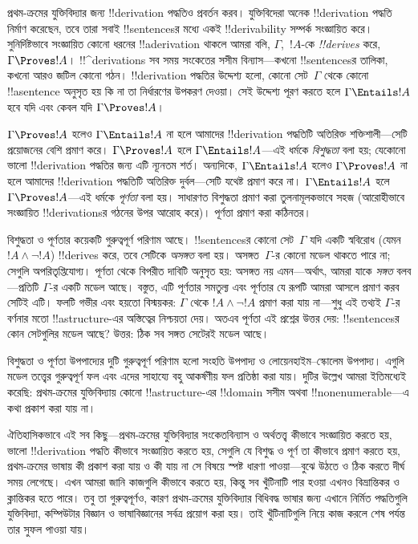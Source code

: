 \documentclass[../../../include/open-logic-section]{subfiles}
\begin{document}


প্রথম-ক্রমের যুক্তিবিদ্যার জন্য !!{derivation} পদ্ধতিও প্রবর্তন করব।
যুক্তিবিদেরা অনেক !!{derivation} পদ্ধতি নির্মাণ করেছেন, তবে তারা সবাই
!!{sentence}sর মধ্যে একই !!{derivability} সম্পর্ক সংজ্ঞায়িত করে।
সুনির্দিষ্টভাবে সংজ্ঞায়িত কোনো ধরনের !!a{derivation} থাকলে আমরা বলি,
$\Gamma$,~$!A$-কে \emph{!!{derive}s} করে, $\Gamma \Proves !A$।
!!^{derivation}s সব সময় সংকেতের সসীম বিন্যাস—কখনো !!{sentence}sর
তালিকা, কখনো আরও জটিল কোনো গঠন। !!{derivation} পদ্ধতির উদ্দেশ্য হলো,
কোনো সেট~$\Gamma$ থেকে কোনো !!a{sentence} অনুসৃত হয় কি না তা নির্ধারণের
উপকরণ দেওয়া। সেই উদ্দেশ্য পূরণ করতে হলে $\Gamma \Entails !A$ হবে যদি
এবং কেবল যদি $\Gamma \Proves !A$।

$\Gamma \Proves !A$ হলেও $\Gamma \Entails !A$ না হলে আমাদের
!!{derivation} পদ্ধতিটি অতিরিক্ত শক্তিশালী—সেটি প্রয়োজনের বেশি প্রমাণ
করে। $\Gamma \Proves !A$ হলে $\Gamma \Entails !A$—এই ধর্মকে
\emph{বিশুদ্ধতা} বলা হয়; যেকোনো ভালো !!{derivation} পদ্ধতির জন্য এটি
ন্যূনতম শর্ত। অন্যদিকে, $\Gamma \Entails !A$ হলেও $\Gamma \Proves !A$
না হলে আমাদের !!{derivation} পদ্ধতিটি অতিরিক্ত দুর্বল—সেটি যথেষ্ট প্রমাণ
করে না। $\Gamma \Entails !A$ হলে $\Gamma \Proves !A$—এই ধর্মকে
\emph{পূর্ণতা} বলা হয়। সাধারণত বিশুদ্ধতা প্রমাণ করা তুলনামূলকভাবে সহজ
(আরোহীভাবে সংজ্ঞায়িত !!{derivation}sর গঠনের উপর আরোহ করে)। পূর্ণতা
প্রমাণ করা কঠিনতর।

বিশুদ্ধতা ও পূর্ণতার কয়েকটি গুরুত্বপূর্ণ পরিণাম আছে। !!{sentence}sর
কোনো সেট~$\Gamma$ যদি একটি স্ববিরোধ (যেমন $!A \land \lnot !A$)
!!{derive}s করে, তবে সেটিকে \emph{অসঙ্গত} বলা হয়। অসঙ্গত~$\Gamma$-র কোনো
মডেল থাকতে পারে না; সেগুলি অপরিতৃপ্তিযোগ্য। পূর্ণতা থেকে বিপরীত দাবিটি
অনুসৃত হয়: অসঙ্গত নয় এমন—অর্থাৎ, আমরা যাকে \emph{সঙ্গত} বলব—প্রতিটি
$\Gamma$-র একটি মডেল আছে। বস্তুত, এটি পূর্ণতার সমতুল্য এবং পূর্ণতার যে
রূপটি আমরা আসলে প্রমাণ করব সেটিই এটি। ফলটি গভীর এবং হয়তো বিস্ময়কর:
$\Gamma$ থেকে $!A \land \lnot !A$ প্রমাণ করা যায় না—শুধু এই তথ্যই
$\Gamma$-র বর্ণনার মতো !!a{structure}-এর অস্তিত্বের নিশ্চয়তা দেয়।
অতএব পূর্ণতা এই প্রশ্নের উত্তর দেয়: !!{sentence}sর কোন সেটগুলির মডেল
আছে? উত্তর: ঠিক সব সঙ্গত সেটেরই মডেল আছে।

বিশুদ্ধতা ও পূর্ণতা উপপাদ্যের দুটি গুরুত্বপূর্ণ পরিণাম হলো সংহতি উপপাদ্য
ও লোয়েনহাইম--স্কোলেম উপপাদ্য। এগুলি মডেল তত্ত্বের গুরুত্বপূর্ণ ফল এবং
এদের সাহায্যে বহু আকর্ষণীয় ফল প্রতিষ্ঠা করা যায়। দুটির উল্লেখ আমরা
ইতিমধ্যেই করেছি: প্রথম-ক্রমের যুক্তিবিদ্যায় কোনো !!a{structure}-এর
!!{domain} সসীম অথবা !!{nonenumerable}—এ কথা প্রকাশ করা যায় না।

ঐতিহাসিকভাবে এই সব কিছু—প্রথম-ক্রমের যুক্তিবিদ্যার সংকেতবিন্যাস ও
অর্থতত্ত্ব কীভাবে সংজ্ঞায়িত করতে হয়, ভালো !!{derivation} পদ্ধতি কীভাবে
সংজ্ঞায়িত করতে হয়, সেগুলি যে বিশুদ্ধ ও পূর্ণ তা কীভাবে প্রমাণ করতে হয়,
প্রথম-ক্রমের ভাষায় কী প্রকাশ করা যায় ও কী যায় না সে বিষয়ে স্পষ্ট
ধারণা পাওয়া—বুঝে উঠতে ও ঠিক করতে দীর্ঘ সময় লেগেছে। এখন আমরা জানি
কাজগুলি কীভাবে করতে হয়, কিন্তু সব খুঁটিনাটি পার হওয়া এখনও বিভ্রান্তিকর
ও ক্লান্তিকর হতে পারে। তবু তা গুরুত্বপূর্ণও, কারণ প্রথম-ক্রমের
যুক্তিবিদ্যার বিধিবদ্ধ ভাষার জন্য এখানে নির্মিত পদ্ধতিগুলি যুক্তিবিদ্যা,
কম্পিউটার বিজ্ঞান ও ভাষাবিজ্ঞানের সর্বত্র প্রয়োগ করা হয়। তাই
খুঁটিনাটিগুলি নিয়ে কাজ করলে শেষ পর্যন্ত তার সুফল পাওয়া যায়।
\end{document}
